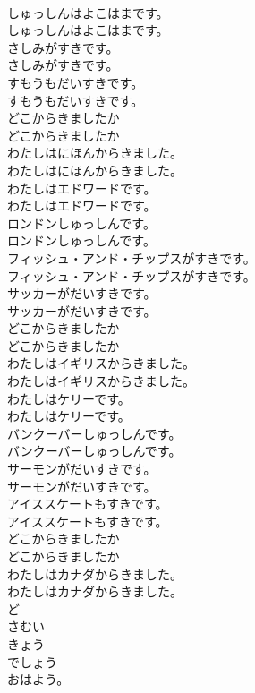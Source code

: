 \documentclass[8pt]{extreport}
\begin{document}
\begin{CJK}{UTF8}{min}
\\	しゅっしんはよこはまです。	
\\	しゅっしんはよこはまです。 
\\	さしみがすきです。	
\\	さしみがすきです。 
\\	すもうもだいすきです。	
\\	すもうもだいすきです。 
\\	どこからきましたか	
\\	どこからきましたか 
\\	わたしはにほんからきました。	
\\	わたしはにほんからきました。 
\\	わたしはエドワードです。	
\\	わたしはエドワードです。 
\\	ロンドンしゅっしんです。	
\\	ロンドンしゅっしんです。 
\\	フィッシュ・アンド・チップスがすきです。	
\\	フィッシュ・アンド・チップスがすきです。 
\\	サッカーがだいすきです。	
\\	サッカーがだいすきです。 
\\	どこからきましたか	
\\	どこからきましたか 
\\	わたしはイギリスからきました。	
\\	わたしはイギリスからきました。 
\\	わたしはケリーです。	
\\	わたしはケリーです。 
\\	バンクーバーしゅっしんです。	
\\	バンクーバーしゅっしんです。 
\\	サーモンがだいすきです。	
\\	サーモンがだいすきです。 
\\	アイススケートもすきです。	
\\	アイススケートもすきです。 
\\	どこからきましたか	
\\	どこからきましたか 
\\	わたしはカナダからきました。	
\\	わたしはカナダからきました。 
\\	ど
\\	さむい
\\	きょう
\\	でしょう
\\	おはよう。	

\end{CJK}
\end{document}
